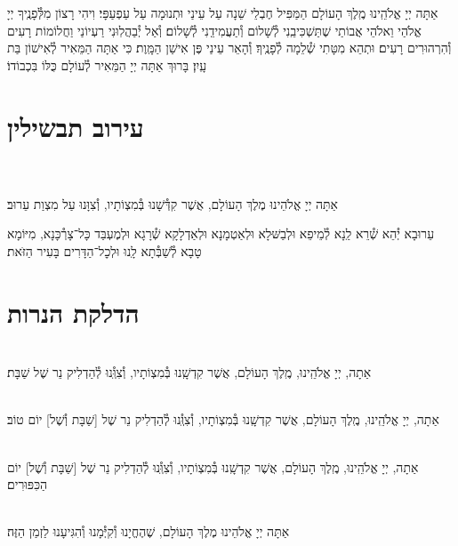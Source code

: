 \documentclass[twoside, openany, parskip=half, 11pt]{book}
\begin{document}
אַתָּה יְיָ אֱלֹהֵֽינוּ מֶֽלֶךְ הָעוֹלָם הַמַּפִּיל חֶבְלֵי שֵׁנָה עַל עֵינַי וּתְנוּמָה עַל עַפְעַפָּי׃ וִיהִי רָצוֹן מִלְּ֯פָנֶֽיךָ יְיָ אֱלֹהַי וֵאלֹהֵי אֲבוֹתַי שֶׁתַּשְׁכִּיבֵֽנִי לְ֯שָׁלוֹם וְ֯תַעֲמִידֵֽנִי לְ֯שָׁלוֹם׃ וְ֯אַל יְ֯בַהֲלֽוּנִי רַעְיוֹנַי וַחֲלוֹמוֹת רָעִים וְ֯הִרְהוּרִים רָעִים׃ וּתְהֵא מִטָּתִי שְׁ֯לֵמָה לְ֯פָנֶֽיךָ׃ וְ֯הָאֵר עֵינַי פֶּן אִישַׁן הַמָּֽוֶת׃ כִּי אַתָּה הַמֵּאִיר לְ֯אִישׁוֹן בַּת עָֽיִן׃ בָּרוּךְ אַתָּה יְיָ הַמֵּאִיר לְ֯עוֹלָם כֻּלּוֹ בִּכְבוֹדוֹ׃


\chapter[עירוב תבשילין]{ עירוב תבשילין }

\\
\\
אַתָּה יְיָ אֱלֹהֵינוּ מֶלֶךְ הָעוֹלָם, אֲשֶׁר קִדְּ֯שָׁנוּ בְּ֯מִצְוֹתָיו, וְ֯צִוָּנוּ עַל מִצְוַת עֵרוּב׃

עֵרוּבָא יְ֯הֵא שְׁ֯רֵא לַֽנָא לְ֯מֵיפֵא וּלְבַשּּׁלָא וּלְאַטְמָנָא וּלְאַדְלָקָא שְׁ֯רָגָא וּלְמֶעְבַּד כָּל־צָרְ֯כָּנָא, מִיּוֹמָא טָבָא לְ֯שַׁבְּ֯תָא לָֽנוּ וּלְכׇל־הַדָּרִים בָּעִיר הַזּׂאת׃‏


\vspace{\baselineskip}
{\let\clearpage\relax
\chapter[הדלקת הנרות שבת ויום טוב]{ הדלקת הנרות }}

\\
אַתָה, יְיָ אֱלֹהֵֽינוּ, מֶֽלֶךְ הָעוֹלָם, אֲשֶׁר קִדְשָֽׁנוּ בְּ֯מִצְוֹתָיו, וְ֯צִוְּֽ֯נוּ לְ֯הַדְלִיק נֵר שֶׁל שַׁבָּת׃

\\
אַתָה, יְיָ אֱלֹהֵֽינוּ, מֶֽלֶךְ הָעוֹלָם, אֲשֶׁר קִדְשָֽׁנוּ בְּ֯מִצְוֹתָיו, וְ֯צִוְּֽ֯נוּ לְ֯הַדְלִיק נֵר שֶׁל
[שַׁבָּת וְ֯שֶׁל] יוֹם טוֹב׃

\\
אַתָה, יְיָ אֱלֹהֵֽינוּ, מֶֽלֶךְ הָעוֹלָם, אֲשֶׁר קִדְשָֽׁנוּ בְּ֯מִצְוֹתָיו, וְ֯צִוְּֽ֯נוּ לְ֯הַדְלִיק נֵר שֶׁל
[שַׁבָּת וְ֯שֶׁל] יוֹם הַכִּפּוּרִים׃

\\
אַתָּה יְיָ אֱלֹהֵינוּ מֶלֶךְ הָעוֹלָם, שֶׁהֶחֱיָנוּ וְ֯קִיְּ֯מָנוּ וְ֯הִגִּיעָנוּ לַזְמַן הַזֶּה׃
\end{document}
